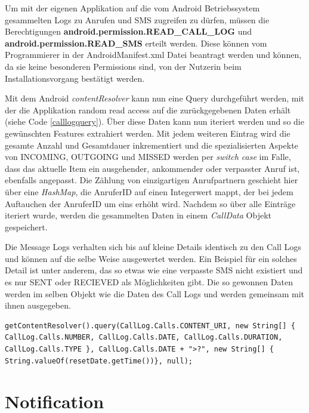 Um mit der eigenen Applikation auf die vom Android Betriebssystem gesammelten Logs zu Anrufen und SMS zugreifen zu dürfen, müssen die Berechtigungen 
\textbf{android.permission.READ\_CALL\_LOG} und \textbf{android.permission.READ\_SMS} erteilt werden.
Diese können vom Programmierer in der AndroidManifest.xml Datei beantragt werden und können, da sie keine besonderen Permissions sind,
von der Nutzerin beim Installationsvorgang bestätigt werden.
\par
Mit dem Android \emph{contentResolver} kann nun eine Query durchgeführt werden, mit der die Applikation random read access auf die zurückgegebenen Daten erhält (siehe Code \ref{calllogquery}).
Über diese Daten kann nun iteriert werden und so die gewünschten Features extrahiert werden.
Mit jedem weiteren Eintrag wird die gesamte Anzahl und Gesamtdauer inkrementiert und die spezialisierten Aspekte von INCOMING, OUTGOING und MISSED werden per \emph{switch case} im Falle, dass das aktuelle Item ein ausgehender, ankommender oder verpasster Anruf ist, ebenfalls angepasst.
Die Zählung von einzigartigen Anrufpartnern geschieht hier über eine \emph{HashMap}, die AnruferID auf einen Integerwert mappt, der bei jedem Auftauchen der AnruferID um eins erhöht wird.
Nachdem so über alle Einträge iteriert wurde, werden die gesammelten Daten in einem \emph{CallData} Objekt gespeichert.
\par

Die Message Logs verhalten sich bis auf kleine Details identisch zu den Call Logs und können auf die selbe Weise ausgewertet werden.
Ein Beispiel für ein solches Detail ist unter anderem, das so etwas wie eine verpasste SMS nicht existiert und es nur SENT oder RECIEVED als Möglichkeiten gibt.
Die so gewonnen Daten werden im selben Objekt wie die Daten des Call Logs und werden gemeinsam mit ihnen ausgegeben.

\begin{lstlisting}[frame=single, caption = Call Log Query, label=calllogquery] 
  getContentResolver().query(CallLog.Calls.CONTENT_URI, new String[] { CallLog.Calls.NUMBER, CallLog.Calls.DATE, CallLog.Calls.DURATION, CallLog.Calls.TYPE }, CallLog.Calls.DATE + ">?", new String[] { String.valueOf(resetDate.getTime())}, null);
\end{lstlisting}

\section{Notification}

